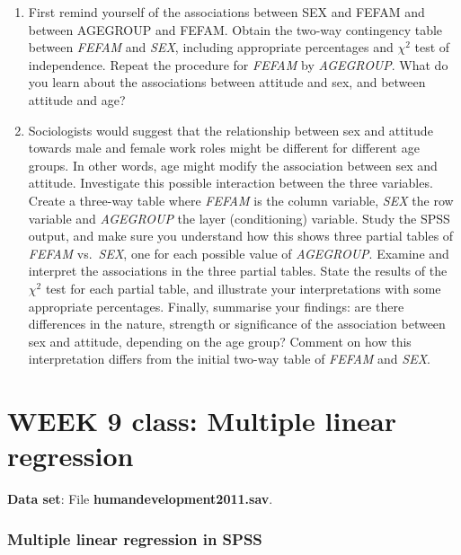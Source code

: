 \begin{enumerate}
\item
First remind yourself of the associations between SEX and FEFAM and between
AGEGROUP and FEFAM. Obtain the two-way contingency
table between \emph{FEFAM} and \emph{SEX}, including appropriate
percentages and $\chi^{2}$ test of independence. Repeat the procedure
for \emph{FEFAM} by \emph{AGEGROUP}. What do you learn about
the associations between attitude and sex, and between attitude and age?
\item
Sociologists would suggest that the relationship between sex and attitude towards
male and female work roles might be different for different age groups. In other
words, age might modify the association between sex and attitude. Investigate this
possible interaction between the three variables.
Create a three-way table where \emph{FEFAM} is the column
variable, \emph{SEX} the row variable  and \emph{AGEGROUP} the layer
(conditioning) variable. Study the SPSS output, and make sure you
understand how this shows three partial tables of \emph{FEFAM} vs.\
\emph{SEX}, one for each possible value of \emph{AGEGROUP}. Examine and
interpret the associations in the three partial tables. State the results of the
$\chi^{2}$ test for each partial table, and illustrate your interpretations with some
appropriate percentages. Finally, summarise your findings: are there
differences in the nature, strength or significance of the association
between sex and attitude, depending on the age group? Comment on how this interpretation
differs from the initial two-way table of \emph{FEFAM} and \emph{SEX}.
\end{enumerate}

\newpage

\section[Week 10: Multiple linear regression]{WEEK 9 class: Multiple linear regression}

\textbf{Data set}: File \textbf{humandevelopment2011.sav}.

\vspace*{-2ex}
\subsubsection{Multiple linear regression in SPSS}

